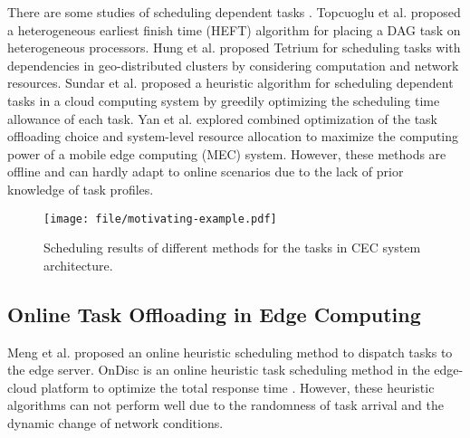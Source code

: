 \documentclass[10pt, conference, letterpaper]{IEEEtran}
\begin{document}
There are some studies of scheduling dependent tasks \cite{topcuoglu2002performance,hung2018wide,yan2019optimal}. Topcuoglu et al. \cite{topcuoglu2002performance} proposed a heterogeneous earliest finish time (HEFT) algorithm for placing a DAG task on heterogeneous processors. Hung et al. \cite{hung2018wide} proposed Tetrium for scheduling tasks with dependencies in geo-distributed clusters by considering computation and network resources. Sundar et al. \cite{sundar2018offloading} proposed a heuristic algorithm for scheduling dependent tasks in a cloud computing system by greedily optimizing the scheduling time allowance of each task. Yan et al. \cite{yan2019optimal} explored combined optimization of the task offloading choice and system-level resource allocation to maximize the computing power of a mobile edge computing (MEC) system. However, these methods are offline and can hardly adapt to online scenarios due to the lack of prior knowledge of task profiles. 
\begin{figure*}[t]
    \centering
    \texttt{[image: file/motivating-example.pdf]}
	\caption{Scheduling results of different methods for the tasks in CEC system architecture.}\label{fig:toy-example}
\end{figure*}

\subsection{Online Task Offloading in Edge Computing}

Meng et al. \cite{meng2019dedas} proposed an online heuristic scheduling method to dispatch tasks to the edge server. OnDisc is an online heuristic task scheduling method in the edge-cloud platform to optimize the total response time \cite{han2019ondisc}. However, these heuristic algorithms can not perform well due to the randomness of task arrival and the dynamic change of network conditions. 
\end{document}
